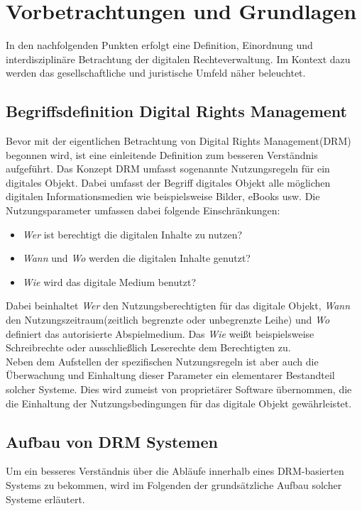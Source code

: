 \chapter{Vorbetrachtungen und Grundlagen}
\label{sec:Vorbetrachtungen und Grundlagen}
\begin{spacing}{1.5}
In den nachfolgenden Punkten erfolgt eine Definition, Einordnung und interdisziplinäre Betrachtung der digitalen Rechteverwaltung. Im Kontext dazu werden das gesellschaftliche und juristische Umfeld näher beleuchtet. 

\section{Begriffsdefinition Digital Rights Management}
\label{sec:Begriffsdefinition Digital Rights Management}
Bevor mit der eigentlichen Betrachtung von Digital Rights Management(DRM) begonnen wird, ist eine einleitende Definition zum besseren Verständnis aufgeführt. Das Konzept DRM umfasst sogenannte Nutzungsregeln für ein digitales Objekt. Dabei umfasst der Begriff digitales Objekt alle möglichen digitalen Informationsmedien wie beispielsweise Bilder, eBooks usw. Die Nutzungsparameter umfassen dabei folgende Einschränkungen:

\begin{itemize}
\item \textit{Wer} ist berechtigt die digitalen Inhalte zu nutzen?
\item \textit{Wann} und \textit{Wo} werden die digitalen Inhalte genutzt?
\item \textit{Wie} wird das digitale Medium benutzt?
\end{itemize}

Dabei beinhaltet \textit{Wer} den Nutzungsberechtigten für das digitale Objekt, \textit{Wann} den Nutzungszeitraum(zeitlich begrenzte oder unbegrenzte Leihe) und \textit{Wo} definiert das autorisierte Abspielmedium. Das \textit{Wie} weißt beispielsweise Schreibrechte oder ausschließlich Leserechte dem Berechtigten zu. \cite [S.227]{DRM} \\
Neben dem Aufstellen der spezifischen Nutzungsregeln ist aber auch die Überwachung und Einhaltung dieser Parameter ein elementarer Bestandteil solcher Systeme. Dies wird zumeist von proprietärer Software übernommen, die die Einhaltung der Nutzungsbedingungen für das digitale Objekt gewährleistet.   

\section{Aufbau von DRM Systemen}
\label{Architektonischer Aufbau von DRM Systemen} 
Um ein besseres Verständnis über die Abläufe innerhalb eines DRM-basierten Systems zu bekommen, wird im Folgenden der grundsätzliche Aufbau solcher Systeme erläutert. 


\end{spacing}
